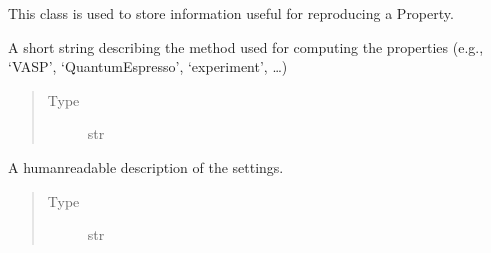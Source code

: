 \documentclass[letterpaper,10pt,english]{sphinxmanual}
\begin{document}
\begin{fulllineitems}
\label{\detokenize{property_settings:colabfit.tools.property_settings.PropertySettings}}
\sphinxAtStartPar
This class is used to store information useful for reproducing a Property.

\begin{fulllineitems}
\label{\detokenize{property_settings:colabfit.tools.property_settings.PropertySettings.method}}
\sphinxAtStartPar
A short string describing the method used for computing the
properties (e.g., ‘VASP’, ‘QuantumEspresso’, ‘experiment’, …)
\begin{quote}\begin{description}
\item[{Type}] \leavevmode
\sphinxAtStartPar
str

\end{description}\end{quote}

\end{fulllineitems}


\begin{fulllineitems}
\label{\detokenize{property_settings:colabfit.tools.property_settings.PropertySettings.description}}
\sphinxAtStartPar
A human\sphinxhyphen{}readable description of the settings.
\begin{quote}\begin{description}
\item[{Type}] \leavevmode
\sphinxAtStartPar
str


\end{description}
\end{quote}
\end{fulllineitems}
\end{fulllineitems}
\end{document}
